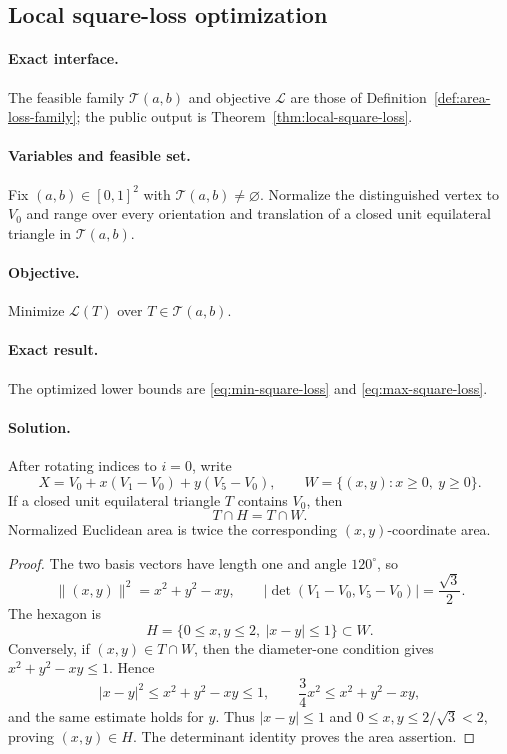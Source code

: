 \subsection{Local square-loss optimization}
\label{subsec:app-local-area-optimization}

\paragraph{Exact interface.}
The feasible family $\mathcal T(a,b)$ and objective $\mathcal L$ are those of
Definition~\ref{def:area-loss-family}; the public output is
Theorem~\ref{thm:local-square-loss}.

\paragraph{Variables and feasible set.}
Fix $(a,b)\in[0,1]^2$ with $\mathcal T(a,b)\ne\varnothing$.  Normalize the
distinguished vertex to $V_0$ and range over every orientation and translation
of a closed unit equilateral triangle in $\mathcal T(a,b)$.

\paragraph{Objective.}
Minimize $\mathcal L(T)$ over $T\in\mathcal T(a,b)$.

\paragraph{Exact result.}
The optimized lower bounds are \eqref{eq:min-square-loss} and
\eqref{eq:max-square-loss}.

\paragraph{Solution.}

\begin{lemma}
\label{lem:area-wedge}
After rotating indices to $i=0$, write
\[
 X=V_0+x(V_1-V_0)+y(V_5-V_0),
 \qquad W=\{(x,y):x\ge0,\ y\ge0\}.
\]
If a closed unit equilateral triangle $T$ contains $V_0$, then
\[
 T\cap H=T\cap W.
\]
Normalized Euclidean area is twice the corresponding $(x,y)$-coordinate
area.
\end{lemma}

\begin{proof}
The two basis vectors have length one and angle $120^\circ$, so
\[
 \lVert(x,y)\rVert^2=x^2+y^2-xy,
 \qquad
 \left\lvert\det(V_1-V_0,V_5-V_0)\right\rvert=\frac{\sqrt3}{2}.
\]
The hexagon is
\[
 H=\{0\le x,y\le2,\ |x-y|\le1\}\subset W.
\]
Conversely, if $(x,y)\in T\cap W$, then the diameter-one condition gives
$x^2+y^2-xy\le1$.  Hence
\[
 |x-y|^2\le x^2+y^2-xy\le1,
 \qquad
 \frac34x^2\le x^2+y^2-xy,
\]
and the same estimate holds for $y$.  Thus $|x-y|\le1$ and
$0\le x,y\le2/\sqrt3<2$, proving $(x,y)\in H$.  The determinant identity
proves the area assertion.
\end{proof}

